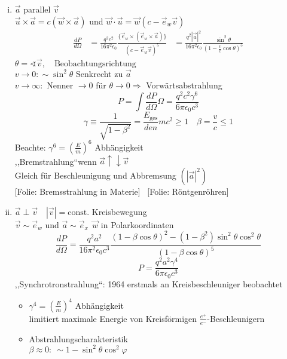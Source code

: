 \documentclass[titlepage,12pt,a4paper,ngerman]{report}
\newcommand{\tx}[1]{\textrm{#1}}
\newcommand{\folie}[1]{\color{gray}[Folie: #1]\color{black}}
\newcommand{\const}{\tx{const.}}
\begin{document}
\begin{enumerate}[i)]
	\item $ \vec{a} $ parallel $ \vec{v} $\\
	$ \vec{u} \times \vec{a} = c (\vec{w} \times \vec{a}) $ und $ \vec{w} \cdot \vec{u} = \vec{w} (c - \vec{e}_w \vec{v}) $
	\begin{align*}
	\frac{dP}{d \Omega} &= \frac{q^2 c^2}{16 \pi^2 \epsilon_0} \frac{\{\vec{e}_w \times (\vec{e}_w \times \vec{a})\}}{(c - \vec{e}_w \vec{v})^5}
	&= \frac{q^2 |\vec{a}|^2}{16 \pi^2 \epsilon_0} \frac{\sin^2 \theta}{(1 - \frac{v}{c} \cos \theta) ^5}
	\end{align*}
	$\theta = \sphericalangle \vec{v} , \quad \tx{Beobachtungsrichtung}$\\
	$ v \rightarrow 0 : \sim \sin^2 \theta $ Senkrecht zu $ \vec{a} $\\
	$ v \rightarrow \infty : $ Nenner $ \rightarrow 0 $ für $ \theta \rightarrow 0 \Rightarrow $ Vorwärtsabstrahlung
	$$\boxed{P = \int \frac{dP}{d\Omega} \Omega  = \frac{q^2 c^2 \gamma^6}{6 \pi \epsilon_0 c^3} }$$
	$$\gamma \equiv \frac{1}{\sqrt{ 1 - \beta^2}} = \frac{E_{\tx{ges}}}{den}m c^2 \ge 1 \quad \beta = \frac{v}{c} \le 1$$
	Beachte: $ \gamma^6 = (\frac{E}{m})^6 $ Abhängigkeit\\
	,,Bremstrahlung``wenn $ \vec{a} \uparrow \downarrow \vec{v} $\\
	Gleich für Beschleunigung und Abbremsung $ (|\vec{a}|^2) $\\
	\folie{Bremsstrahlung in Materie} \ \folie{Röntgenröhren}
	\item $ \vec{a} \perp \vec{v}\quad |\vec{v}| = \const $ Kreisbewegung\\
	$ \vec{v} \sim \vec{e}_w $ und $ \vec{a} \sim \vec{e}_x \ \  \vec{w} $ in Polarkoordinaten
	$$\frac{dP}{d \Omega} = \frac{q^2 a^2}{16 \pi^2 \epsilon_0 c^3} \frac{(1 - \beta \cos \theta) ^2 - (1-\beta^2) \sin^2 \theta \cos ^2 \theta}{(1-\beta \cos \theta) ^5}$$
	$$P = \frac{q^2 a^2 \gamma^4}{6 \pi \epsilon_0 c^3}$$
	,,Synchrotronstrahlung``: 1964 erstmals an Kreisbeschleuniger beobachtet
	\begin{itemize}
		\item $ \gamma^4 = (\frac{E}{m})^4 $ Abhängigkeit\\
		limitiert maximale Energie von Kreisförmigen $ \frac{e^+}{e^-} $-Beschleunigern
		\item Abstrahlungscharakteristik\\
		$ \beta \approx 0: \ \sim 1 - \sin^2 \theta \cos^2 \varphi $\\

\end{itemize}
\end{enumerate}
\end{document}
